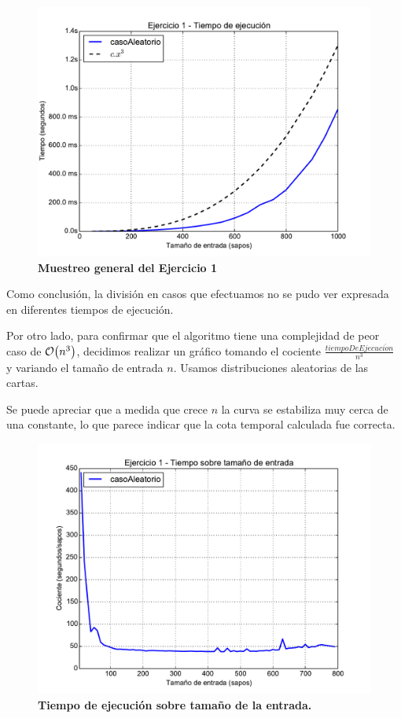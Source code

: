 \documentclass[11pt, a4paper, twoside]{article}
\begin{document}
\begin{figure}[H]
   \begin{center}
   \includegraphics[width=1.4\textwidth, angle=90]{../ej1/graficos/test_tiempoLiso.pdf}
   \caption{\textbf{Muestreo general del Ejercicio 1}}
   \label{fig:ej1-graf-1}
   \end{center}
\end{figure}
\clearpage

Como conclusión, la división en casos que efectuamos no se pudo ver expresada en diferentes tiempos de ejecución.

Por otro lado, para confirmar que el algoritmo tiene una complejidad de peor caso de $\mathop{}\mathopen{}\mathcal{O}\mathopen{}\left(n^3\right)$, decidimos 
realizar un gráfico tomando el cociente $\frac{tiempoDeEjecuci\acute{o}n}{n^3}$ y variando el tamaño de entrada $n$. Usamos distribuciones aleatorias de las cartas.

Se puede apreciar que a medida que crece $n$ la curva se estabiliza muy cerca de una constante, lo que parece indicar que la cota temporal calculada fue correcta. 

\begin{figure}[H]
   \begin{center}
   \includegraphics[width=1.4\textwidth,angle=90]{../ej1/graficos/test_division.pdf}
   \caption{\textbf{Tiempo de ejecución sobre tamaño de la entrada.}}
   \label{fig:ej1-graf-2}
   \end{center}
\end{figure}
  
\end{document}
